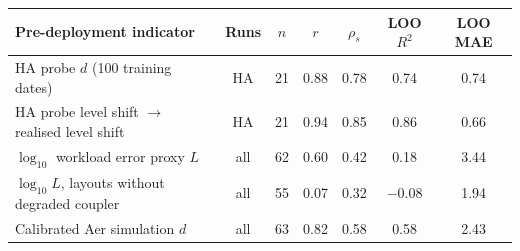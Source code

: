 \begin{tabular}{@{}lcccccc@{}}
\toprule
Pre-deployment indicator & Runs & $n$ & $r$ & $\rho_s$ & LOO $R^2$ & LOO MAE \\
\midrule
HA probe $d$ (100 training dates) & HA & 21 & 0.88 & 0.78 & 0.74 & 0.74 \\
HA probe level shift $\to$ realised level shift & HA & 21 & 0.94 & 0.85 & 0.86 & 0.66 \\
$\log_{10}$ workload error proxy $L$ & all & 62 & 0.60 & 0.42 & 0.18 & 3.44 \\
$\log_{10} L$, layouts without degraded coupler & all & 55 & 0.07 & 0.32 & $-$0.08 & 1.94 \\
Calibrated Aer simulation $d$ & all & 63 & 0.82 & 0.58 & 0.58 & 2.43 \\
\bottomrule
\end{tabular}
